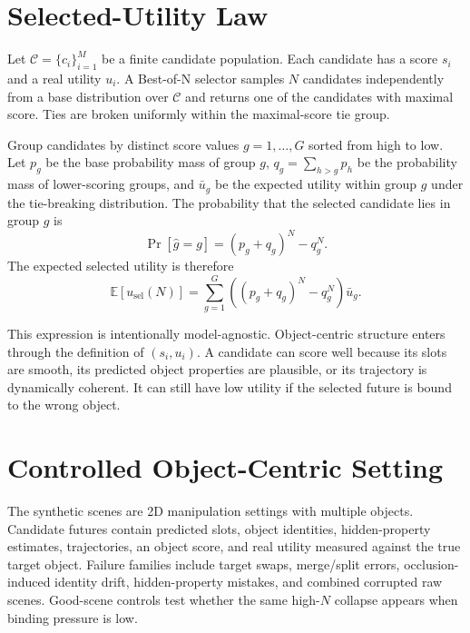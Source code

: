 \documentclass[10pt]{article}
\begin{document}
\section{Selected-Utility Law}

Let $\mathcal{C}=\{c_i\}_{i=1}^{M}$ be a finite candidate population. Each candidate has a score $s_i$ and a real utility $u_i$. A Best-of-N selector samples $N$ candidates independently from a base distribution over $\mathcal{C}$ and returns one of the candidates with maximal score. Ties are broken uniformly within the maximal-score tie group.

Group candidates by distinct score values $g=1,\ldots,G$ sorted from high to low. Let $p_g$ be the base probability mass of group $g$, $q_g=\sum_{h>g} p_h$ be the probability mass of lower-scoring groups, and $\bar{u}_g$ be the expected utility within group $g$ under the tie-breaking distribution. The probability that the selected candidate lies in group $g$ is
\begin{equation}
  \Pr[\hat{g}=g] = (p_g + q_g)^N - q_g^N.
\end{equation}
The expected selected utility is therefore
\begin{equation}
  \mathbb{E}[u_{\mathrm{sel}}(N)] =
  \sum_{g=1}^{G} \left((p_g+q_g)^N - q_g^N\right)\bar{u}_g.
\end{equation}

This expression is intentionally model-agnostic. Object-centric structure enters through the definition of $(s_i,u_i)$. A candidate can score well because its slots are smooth, its predicted object properties are plausible, or its trajectory is dynamically coherent. It can still have low utility if the selected future is bound to the wrong object.

\section{Controlled Object-Centric Setting}

The synthetic scenes are 2D manipulation settings with multiple objects. Candidate futures contain predicted slots, object identities, hidden-property estimates, trajectories, an object score, and real utility measured against the true target object. Failure families include target swaps, merge/split errors, occlusion-induced identity drift, hidden-property mistakes, and combined corrupted raw scenes. Good-scene controls test whether the same high-$N$ collapse appears when binding pressure is low.
\end{document}
